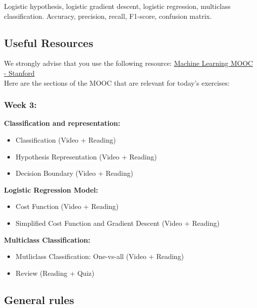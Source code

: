 \documentclass[]{article}
\begin{document}
Logistic hypothesis, logistic gradient descent, logistic regression,
multiclass classification. Accuracy, precision, recall, F1-score,
confusion matrix.

\hypertarget{useful-resources}{%
\subsection{Useful Resources}\label{useful-resources}}

We strongly advise that you use the following resource:
\href{https://www.coursera.org/learn/machine-learning/home/week/3}{Machine
Learning MOOC - Stanford}\\
Here are the sections of the MOOC that are relevant for today's
exercises:

\hypertarget{week-3}{%
\subsubsection{Week 3:}\label{week-3}}

\textbf{Classification and representation:}

\begin{itemize}
\item
  Classification (Video + Reading)
\item
  Hypothesis Representation (Video + Reading)
\item
  Decision Boundary (Video + Reading)
\end{itemize}

\textbf{Logistic Regression Model:}

\begin{itemize}
\item
  Cost Function (Video + Reading)
\item
  Simplified Cost Function and Gradient Descent (Video + Reading)
\end{itemize}

\textbf{Multiclass Classification:}

\begin{itemize}
\item
  Mutliclass Classification: One-vs-all (Video + Reading)
\item
  Review (Reading + Quiz)
\end{itemize}

\hypertarget{general-rules}{%
\subsection{General rules}\label{general-rules}}
\end{document}
